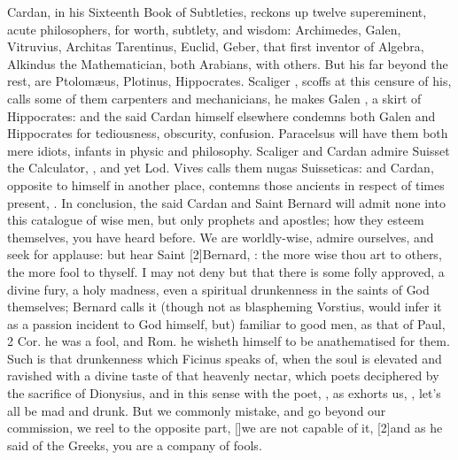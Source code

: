 Cardan, in his Sixteenth Book of Subtleties, reckons up twelve
supereminent, acute philosophers, for worth, subtlety, and wisdom:
Archimedes, Galen, Vitruvius, Architas Tarentinus, Euclid, Geber, that
first inventor of Algebra, Alkindus the Mathematician, both Arabians,
with others. But his  far beyond the rest, are
Ptolom\ae{}us, Plotinus, Hippocrates. Scaliger , scoffs at
this censure of his, calls some of them carpenters and mechanicians, he
makes Galen , a skirt of Hippocrates: and the said
Cardan himself elsewhere condemns both Galen and Hippocrates for
tediousness, obscurity, confusion. Paracelsus will have them both mere
idiots, infants in physic and philosophy. Scaliger and Cardan admire
Suisset the Calculator, , and yet
Lod. Vives calls them nugas Suisseticas: and Cardan, opposite to
himself in another place, contemns those ancients in respect of times
present, . In conclusion, the said Cardan and Saint Bernard will
admit none into this catalogue of wise men, but only prophets and
apostles; how they esteem themselves, you have heard before. We are
worldly-wise, admire ourselves, and seek for applause: but hear Saint
[2\baselineskip]Bernard, : the more
wise thou art to others, the more fool to thyself. I may not deny but
that there is some folly approved, a divine fury, a holy madness, even
a spiritual drunkenness in the saints of God themselves;  Bernard calls it (though not as blaspheming Vorstius,
would infer it as a passion incident to God himself, but) familiar to
good men, as that of Paul, 2 Cor. he was a fool, \etc{} and Rom.  he
wisheth himself to be anathematised for them. Such is that drunkenness
which Ficinus speaks of, when the soul is elevated and ravished with a
divine taste of that heavenly nectar, which poets deciphered by the
sacrifice of Dionysius, and in this sense with the poet, , as \Austin{} exhorts us, , let's all
be mad and drunk. But we commonly mistake, and go beyond our
commission, we reel to the opposite part, [\baselineskip]we are not capable of
it, [2\baselineskip]and as he said of the Greeks,  you are a company of fools.

